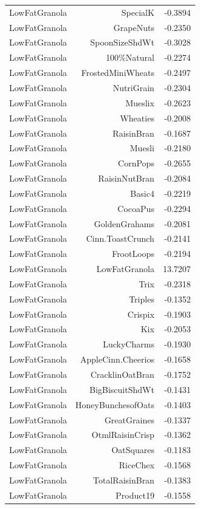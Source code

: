 \begin{longtable}{@{}lrr@{}}
LowFatGranola & SpecialK & -0.3894 \\
LowFatGranola & GrapeNuts & -0.2350 \\
LowFatGranola & SpoonSizeShdWt & -0.3028 \\
LowFatGranola & 100\%Natural & -0.2274 \\
LowFatGranola & FrostedMiniWheats & -0.2497 \\
LowFatGranola & NutriGrain & -0.2304 \\
LowFatGranola & Mueslix & -0.2623 \\
LowFatGranola & Wheaties & -0.2008 \\
LowFatGranola & RaisinBran & -0.1687 \\
LowFatGranola & Muesli & -0.2180 \\
LowFatGranola & CornPops & -0.2655 \\
LowFatGranola & RaisinNutBran & -0.2084 \\
LowFatGranola & Basic4 & -0.2219 \\
LowFatGranola & CocoaPus & -0.2294 \\
LowFatGranola & GoldenGrahams & -0.2081 \\
LowFatGranola & Cinn.ToastCrunch & -0.2141 \\
LowFatGranola & FrootLoops & -0.2194 \\
LowFatGranola & LowFatGranola & 13.7207 \\
LowFatGranola & Trix & -0.2318 \\
LowFatGranola & Triples & -0.1352 \\
LowFatGranola & Crispix & -0.1903 \\
LowFatGranola & Kix & -0.2053 \\
LowFatGranola & LuckyCharms & -0.1930 \\
LowFatGranola & AppleCinn.Cheerios & -0.1658 \\
LowFatGranola & CracklinOatBran & -0.1752 \\
LowFatGranola & BigBiscuitShdWt & -0.1431 \\
LowFatGranola & HoneyBunchesofOats & -0.1403 \\
LowFatGranola & GreatGraines & -0.1337 \\
LowFatGranola & OtmlRaisinCrisp & -0.1362 \\
LowFatGranola & OatSquares & -0.1183 \\
LowFatGranola & RiceChex & -0.1568 \\
LowFatGranola & TotalRaisinBran & -0.1383 \\
LowFatGranola & Product19 & -0.1558 \\

\end{longtable}
